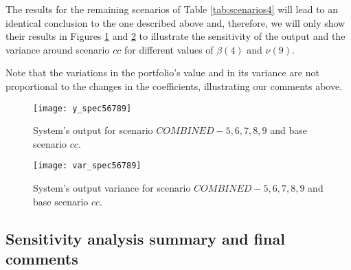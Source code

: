 The results for the remaining scenarios of Table \ref{tab:scenarios4} will lead to an identical conclusion to the one described above and, therefore, we will only show their results in Figures \ref{fig:y_spec56789} and \ref{fig:var_spec56789} to illustrate the sensitivity of the output and the variance around scenario $cc$ for different values of $\beta(4)$ and $\nu(9)$.

Note that the variations in the portfolio's value and in its variance are not proportional to the changes in the coefficients, illustrating our comments above.
%
\begin{figure} [H]
    \caption{System's output for scenario $COMBINED-5,6,7,8,9$ and base scenario $cc$.}
    \centering
    \texttt{[image: y\_spec56789]}
    \label{fig:y_spec56789}
\end{figure}
%
\begin{figure} [H]
    \caption{System's output variance for scenario $COMBINED-5,6,7,8,9$ and base scenario $cc$.}
    \centering
    \texttt{[image: var\_spec56789]}
    \label{fig:var_spec56789}
\end{figure}
\vfill

\subsection{Sensitivity analysis summary and final comments} \label{sens_summary}

